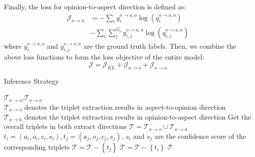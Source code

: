 \documentclass[11pt]{article}
\begin{document}
Finally, the loss for opinion-to-aspect direction is defined as:
\begin{equation}
	\begin{split}
		\mathcal{J}_{o\rightarrow a}&=-\sum_{i} y^{o\rightarrow a,o}_{i} \log\left(q^{o\rightarrow a,o}_{i}\right) \\ 
		&- \sum_{i} \sum_{j}^{G_{o}} y^{o\rightarrow a,a}_{i,j} \log\left(q^{o\rightarrow a,a}_{i,j}\right)
	\end{split}
\end{equation}
where $y^{o\rightarrow a,o}_{i}$ and $y^{o\rightarrow a,a}_{i,j}$ are the ground truth labels. Then, we combine the above loss functions to form the loss objective of the entire model:
\begin{equation}
	\mathcal{J}= \mathcal{J}_{KL} +  \mathcal{J}_{a\rightarrow o} + \mathcal{J}_{o\rightarrow a}
\end{equation}

\begin{algorithm}[t] 
	\caption{Inference Strategy}
	\renewcommand{\algorithmicrequire}{\textbf{Input:}}
	\renewcommand{\algorithmicensure}{\textbf{Output:}}
	\begin{algorithmic}[1] \label{algorithm}
		\REQUIRE $\mathcal{T}_{a\rightarrow o} $,$ \mathcal{T}_{o\rightarrow a}$ \\
		$\mathcal{T}_{a\rightarrow o}$ denotes the triplet extraction results in aspect-to-opinion direction \\
		$\mathcal{T}_{o\rightarrow a}$ denotes the triplet extraction results in opinion-to-aspect direction
		\STATE Get the overall triplets in both extract directions $\mathcal{T} = \mathcal{T}_{a\rightarrow o} \cup \mathcal{T}_{o\rightarrow a}$
		\STATE $t_{i}= (a_{i},o_{i},c_{i},s_{i}), t_{j}= ( a_{j}, o_{j},c_{j},s_{j})$, $s_{i}$ and $s_{j}$ are the confidence score of the corresponding triplets
		\STATE $\mathcal{T} =  \mathcal{T} - \left\{ t_{j} \right\}$
		\ELSE
		\STATE $\mathcal{T} =  \mathcal{T} - \left\{ t_{i} \right\}$
		\ENDIF
		\ENDIF
		\ENDFOR
		\ENDFOR
		\RETURN $\mathcal{T}$
	\end{algorithmic}
\end{algorithm}
\end{document}
